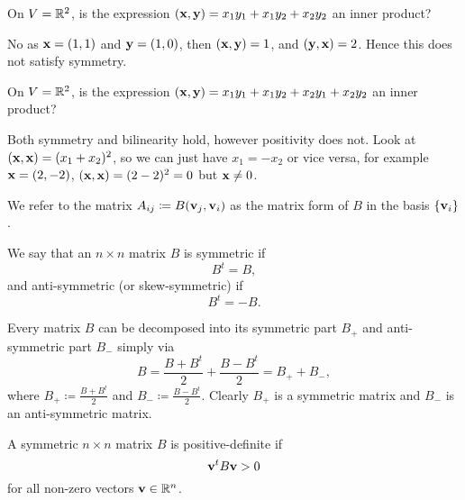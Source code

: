 \documentclass[10pt, a4paper]{article}
\begin{document}
\begin{example}
    On $V = \mathbb{R} ^ 2$,
    is the expression $(\mathbf{x}, \mathbf{y}) = x_1y_1 + x_1y_2 + x_2y_2$ an inner product?

    \begin{solution}
        No as $\mathbf{x} = (1, 1)$ and $\mathbf{y} = (1, 0)$,
        then $(\mathbf{x}, \mathbf{y}) = 1$,
        and $(\mathbf{y}, \mathbf{x}) = 2$.
        Hence this does not satisfy symmetry.
    \end{solution}
\end{example}

\begin{example}
    On $V = \mathbb{R} ^ 2$,
    is the expression $(\mathbf{x}, \mathbf{y}) = x_1y_1 + x_1y_2 + x_2y_1 + x_2y_2$ an inner product?

    \begin{solution}
        Both symmetry and bilinearity hold,
        however positivity does not.
        Look at $(\mathbf{x}, \mathbf{x}) = (x_1 + x_2) ^ 2$,
        so we can just have $x_1 = -x_2$ or vice versa,
        for example $\mathbf{x} = (2, -2)$,
        $(\mathbf{x}, \mathbf{x}) = (2 - 2) ^ 2 = 0$ but $\mathbf{x} \neq 0$.
    \end{solution}
\end{example}

\begin{definition}
    We refer to the matrix $A_{ij} \coloneqq B(\mathbf{v}_j, \mathbf{v}_i)$ as the matrix form of $B$ in the basis $\{\mathbf{v}_i\}$.
\end{definition}

\begin{definition}
    We say that an $n \times n$ matrix $B$ is symmetric if
    \[
    B ^ t = B,
    \]
    and anti-symmetric
    (or skew-symmetric)
    if
    \[
    B ^ t = -B.
    \]
\end{definition}

\begin{definition}
    Every matrix $B$ can be decomposed into its symmetric part $B_{+}$ and anti-symmetric part $B_{-}$ simply via
    \[
    B = \frac{B + B ^ {t}}{2} + \frac{B - B ^ {t}}{2} = B_{+} + B_{-},
    \]
    where $B_{+} \coloneqq \frac{B + B ^ {t}}{2}$ and $B_{-} \coloneqq \frac{B - B ^ {t}}{2}$.
    Clearly $B_{+}$ is a symmetric matrix and $B_{-}$ is an anti-symmetric matrix.
\end{definition}

\begin{definition}
    A symmetric $n \times n$ matrix $B$ is positive-definite if
    \[
    \mathbf{v} ^ tB\mathbf{v} > 0
    \]
    for all non-zero vectors $\mathbf{v} \in \mathbb{R} ^ n$.
\end{definition}
\end{document}
